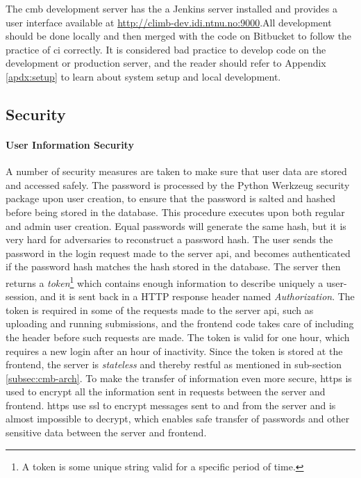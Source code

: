 The \gls{cmb} development server has the a Jenkins server installed and provides a user interface available at \url{http://climb-dev.idi.ntnu.no:9000}.All development should be done locally and then merged with the code on Bitbucket to follow the practice of \gls{ci} correctly. It is considered bad practice to develop code on the development or production server, and the reader should refer to Appendix \ref{apdx:setup} to learn about system setup and local development.

\subsection{Security}

\paragraph*{User Information Security} A number of security measures are taken to make sure that user data are stored and accessed safely. The password is processed by the Python Werkzeug security package \cite{WERKZEUG} upon user creation, to ensure that the password is salted and hashed before being stored in the database. This procedure executes upon both regular and admin user creation. Equal passwords will generate the same hash, but it is very hard for adversaries to reconstruct a password hash. The user sends the password in the login request made to the server \gls{api}, and becomes authenticated if the password hash matches the hash stored in the database. The server then returns a \textit{token}\footnote{A token is some unique string valid for a specific period of time.} which contains enough information to describe uniquely a user-session, and it is sent back in a HTTP response header named \textit{Authorization}. The token is required in some of the requests made to the server \gls{api}, such as uploading and running submissions, and the frontend code takes care of including the header before such requests are made. The token is valid for one hour, which requires a new login after an hour of inactivity. Since the token is stored at the frontend, the server is \textit{stateless} and thereby \gls{rest}ful as mentioned in sub-section \ref{subsec:cmb-arch}. To make the transfer of information even more secure, \gls{https} is used to encrypt all the information sent in requests between the server and frontend. \gls{https} use \gls{ssl} to encrypt messages sent to and from the server and is almost impossible to decrypt, which enables safe transfer of passwords and other sensitive data between the server and frontend.

